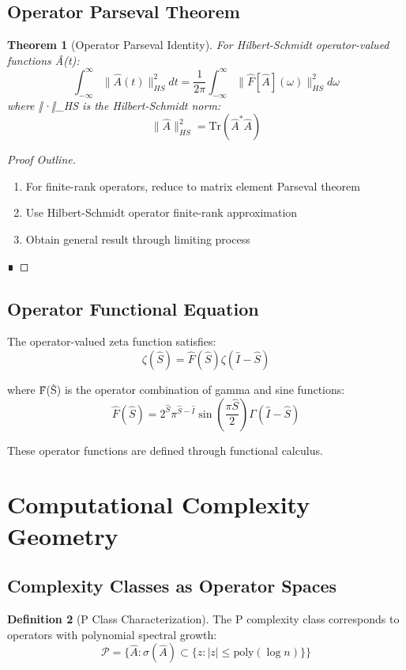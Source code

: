 \documentclass[12pt]{article}
\theoremstyle{plain}
\newtheorem{theorem}{Theorem}[section]
\theoremstyle{definition}
\newtheorem{definition}[theorem]{Definition}
\begin{document}
\subsection{Operator Parseval Theorem}

\begin{theorem}[Operator Parseval Identity]
For Hilbert-Schmidt operator-valued functions Â(t):
$$\int_{-\infty}^{\infty} \|\hat{A}(t)\|_{HS}^2 dt = \frac{1}{2\pi} \int_{-\infty}^{\infty} \|\hat{F}[\hat{A}](\omega)\|_{HS}^2 d\omega$$
where ‖·‖_{HS} is the Hilbert-Schmidt norm:
$$\|\hat{A}\|_{HS}^2 = \text{Tr}(\hat{A}^* \hat{A})$$
\end{theorem}

\begin{proof}[Proof Outline]
\begin{enumerate}
\item For finite-rank operators, reduce to matrix element Parseval theorem
\item Use Hilbert-Schmidt operator finite-rank approximation
\item Obtain general result through limiting process
\end{enumerate} ∎
\end{proof}

\subsection{Operator Functional Equation}

The operator-valued zeta function satisfies:
$$\zeta(\hat{S}) = \hat{F}(\hat{S}) \zeta(\hat{I} - \hat{S})$$

where F̂(Ŝ) is the operator combination of gamma and sine functions:
$$\hat{F}(\hat{S}) = 2^{\hat{S}} \pi^{\hat{S}-\hat{I}} \sin\left(\frac{\pi \hat{S}}{2}\right) \Gamma(\hat{I} - \hat{S})$$

These operator functions are defined through functional calculus.

\section{Computational Complexity Geometry}

\subsection{Complexity Classes as Operator Spaces}

\begin{definition}[P Class Characterization]
The P complexity class corresponds to operators with polynomial spectral growth:
$$\mathcal{P} = \{\hat{A}: \sigma(\hat{A}) \subset \{z: |z| \leq \text{poly}(\log n)\}\}$$
\end{definition}
\end{document}
